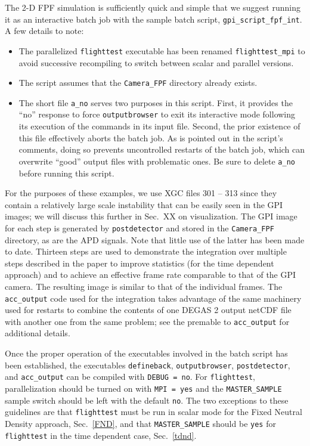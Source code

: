 \documentclass[12pt]{report}
\begin{document}
The 2-D FPF simulation is sufficiently quick and simple
that we suggest running it as an interactive batch job
with the 
sample batch script, {\tt gpi\_script\_fpf\_int}.
A few details to note:
\begin{itemize}
\item The parallelized {\tt flighttest} executable
  has been renamed {\tt flighttest\_mpi} to avoid
  successive recompiling to switch between scalar
  and parallel versions.
\item The script assumes that the {\tt Camera\_FPF}
  directory already exists.
\item The short file {\tt a\_no} serves two purposes
  in this script.  First, it provides the ``no'' response
  to force {\tt outputbrowser} to exit its interactive
  mode following its execution of the commands in its
  input file.  Second,
  the prior existence of this file effectively aborts the batch
  job.  As is pointed out in the
  script's comments, doing so prevents
  uncontrolled restarts of the batch job, which can overwrite
  ``good'' output files with problematic ones.  Be sure to
  delete {\tt a\_no} before running this script.
\end{itemize}
For the purposes of these examples, we use
XGC files 301 -- 313 since they contain a relatively large
scale instability that can be easily seen in the GPI images;
we will discuss this further in Sec.~XX on visualization.
The GPI image for each step is generated by {\tt postdetector}
and stored in the {\tt Camera\_FPF} directory, as are
the APD signals.  Note that little use of the latter has
been made to date.  Thirteen steps are used to
demonstrate the integration
over multiple steps described
in the paper to improve statistics (for the time dependent
approach) and to achieve an effective frame rate comparable
to that of the GPI camera.  The resulting image is similar
to that of the individual frames.  The 
{\tt acc\_output} code used for the integration
takes advantage of the same machinery
used for restarts to combine the contents of one
DEGAS 2 output netCDF file with another one from the
same problem; see the premable to {\tt acc\_output}
for additional details.

Once the proper operation of the executables
involved in the batch script has been established,
the executables {\tt defineback}, {\tt outputbrowser},
{\tt postdetector}, and {\tt acc\_output}
can be compiled with \verb+DEBUG = no+.
For {\tt flighttest}, parallelization should be
turned on with \verb+MPI = yes+ and the
\verb+MASTER_SAMPLE+ sample switch should be left with the
default \verb+no+.  The two exceptions to these
guidelines are that {\tt flighttest} must
be run in scalar mode for the Fixed Neutral
Density approach, Sec.~\ref{FND}, and that
\verb+MASTER_SAMPLE+ should be \verb+yes+ for
{\tt flighttest} in the time dependent
case, Sec.~\ref{tdnd}.
\end{document}
